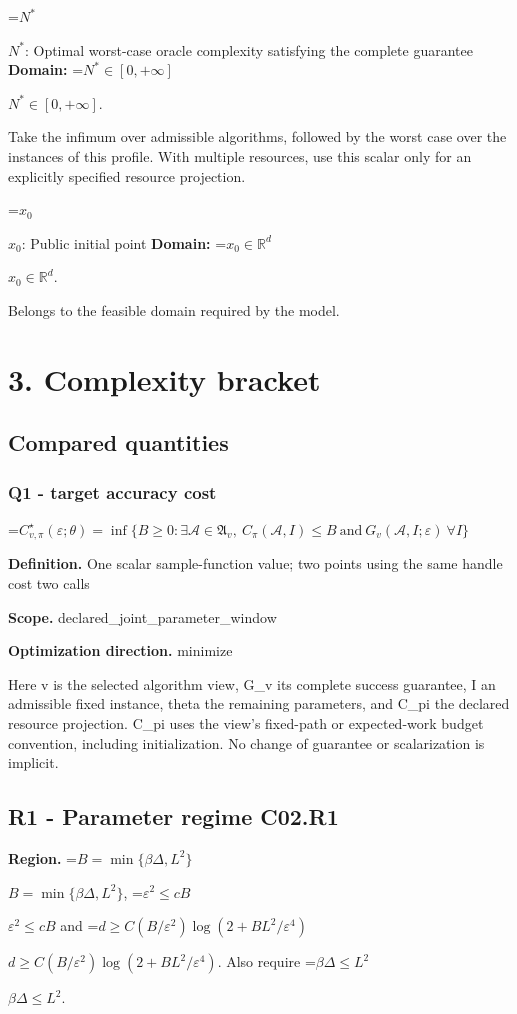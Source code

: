 \documentclass[10pt,a4paper]{article}
\newcommand{\AtlasMath}[1]{\par\begingroup\centering\setbox0=\hbox{$\displaystyle #1$}\ifdim\wd0>1.4\linewidth\typeout{ATLAS WIDE FORMULA: \the\wd0}\fi\ifdim\wd0>\linewidth\resizebox{\linewidth}{!}{\box0}\else\box0\fi\par\endgroup}
\newcommand{\AtlasInlineMath}[1]{\begingroup\setbox0=\hbox{$#1$}\ifdim\wd0>.4\linewidth\endgroup\AtlasMath{#1}\else\endgroup$#1$\fi}
\begin{document}
\AtlasInlineMath{N^*}: Optimal worst-case oracle complexity satisfying the complete guarantee \textbf{Domain:} \AtlasInlineMath{N^*\in[0,+\infty]}.

Take the infimum over admissible algorithms, followed by the worst case over the instances of this profile. With multiple resources, use this scalar only for an explicitly specified resource projection.

\AtlasInlineMath{x_0}: Public initial point \textbf{Domain:} \AtlasInlineMath{x_0\in\mathbb{R}^d}.

Belongs to the feasible domain required by the model.

\section{3. Complexity bracket}
\subsection{Compared quantities}
\subsubsection{Q1 - target accuracy cost}
\AtlasMath{C^\star_{v,\pi}(\varepsilon;\theta)=\inf\{B\ge0:\exists\mathcal A\in\mathfrak A_v,\ C_\pi(\mathcal A,I)\le B\ \text{and}\ G_v(\mathcal A,I;\varepsilon)\ \forall I\}}
\textbf{Definition.} One scalar sample-function value; two points using the same handle cost two calls

\textbf{Scope.} declared\_joint\_parameter\_window

\textbf{Optimization direction.} minimize

Here v is the selected algorithm view, G\_v its complete success guarantee, I an admissible fixed instance, theta the remaining parameters, and C\_pi the declared resource projection. C\_pi uses the view's fixed-path or expected-work budget convention, including initialization. No change of guarantee or scalarization is implicit.

\subsection{R1 - Parameter regime C02.R1}
\textbf{Region.} \AtlasInlineMath{B=\min\{\beta\Delta,L^2\}}, \AtlasInlineMath{\varepsilon^2\le cB} and \AtlasInlineMath{d\ge C(B/\varepsilon^2)\log(2+BL^2/\varepsilon^4)}. Also require \AtlasInlineMath{\beta\Delta\le L^2}.
\end{document}
